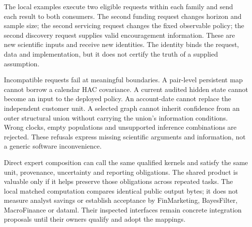 The local examples execute two eligible requests within each family and send
each result to both consumers. The second funding request changes horizon and
sample size; the second servicing request changes the fixed observable policy;
the second discovery request supplies valid encouragement information. These
are new scientific inputs and receive new identities. The identity binds the
request, data and implementation, but it does not certify the truth of a
supplied assumption.

Incompatible requests fail at meaningful boundaries. A pair-level persistent
map cannot borrow a calendar HAC covariance. A current audited hidden state
cannot become an input to the deployed policy. An account-date cannot replace
the independent customer unit. A selected graph cannot inherit confidence from
an outer structural union without carrying the union's information conditions.
Wrong clocks, empty populations and unsupported inference combinations are
rejected. These refusals express missing scientific arguments and information,
not a generic software inconvenience.

Direct expert composition can call the same qualified kernels and satisfy the
same unit, provenance, uncertainty and reporting obligations. The shared product
is valuable only if it helps preserve those obligations across repeated tasks.
The local matched computation compares identical public output bytes; it does
not measure analyst savings or establish acceptance by FinMarketing,
BayesFilter, MacroFinance or dataml. Their inspected interfaces remain concrete
integration proposals until their owners qualify and adopt the mappings.

